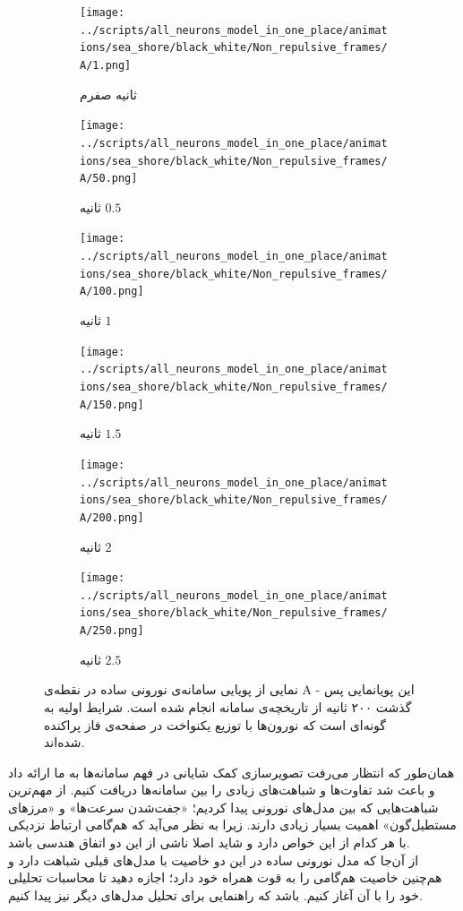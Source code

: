 \newpage
\begin{figure}
	\begin{subfigure}{0.5\textwidth}
		\texttt{[image: ../scripts/all\_neurons\_model\_in\_one\_place/animations/sea\_shore/black\_white/Non\_repulsive\_frames/A/1.png]}
		\caption{
			ثانیه صفرم		
		}
	\end{subfigure}
	\hfill
	\begin{subfigure}{0.5\textwidth}
		\texttt{[image: ../scripts/all\_neurons\_model\_in\_one\_place/animations/sea\_shore/black\_white/Non\_repulsive\_frames/A/50.png]}
		\caption{
			ثانیه $0.5$
		}
	\end{subfigure}
	\hfill
	\begin{subfigure}{0.5\textwidth}
		\texttt{[image: ../scripts/all\_neurons\_model\_in\_one\_place/animations/sea\_shore/black\_white/Non\_repulsive\_frames/A/100.png]}
		\caption{
			ثانیه $1$		
		}
	\end{subfigure}
	\hfill
	\begin{subfigure}{0.5\textwidth}
		\texttt{[image: ../scripts/all\_neurons\_model\_in\_one\_place/animations/sea\_shore/black\_white/Non\_repulsive\_frames/A/150.png]}
		\caption{
			ثانیه $1.5$
		}
	\end{subfigure}
	\hfill
	\begin{subfigure}{0.5\textwidth}
		\texttt{[image: ../scripts/all\_neurons\_model\_in\_one\_place/animations/sea\_shore/black\_white/Non\_repulsive\_frames/A/200.png]}
		\caption{
			ثانیه $2$
		}
	\end{subfigure}
	\hfill
	\begin{subfigure}{0.5\textwidth}
		\texttt{[image: ../scripts/all\_neurons\_model\_in\_one\_place/animations/sea\_shore/black\_white/Non\_repulsive\_frames/A/250.png]}
		\caption{
			ثانیه $2.5$
		}
	\end{subfigure}
	\hfill
	\caption{
		نمایی از پویایی سامانه‌ی نورونی ساده در نقطه‌ی A - این پویانمایی پس گذشت ۲۰۰ ثانیه از تاریخچه‌ی سامانه انجام شده است. شرایط اولیه به گونه‌ای است که نورون‌ها با توزیع یکنواخت در صفحه‌ی فاز پراکنده شده‌اند.	
	}
	\label{fig:simple_animation_A}
\end{figure}

همان‌طور که انتظار می‌رفت تصویرسازی کمک شایانی در فهم سامانه‌ها به ما ارائه داد و باعث شد تفاوت‌ها و شباهت‌های زیادی را بین سامانه‌ها دریافت کنیم. از مهم‌ترین شباهت‌هایی که بین مدل‌های نورونی پیدا کردیم؛ «جفت‌شدن سرعت‌ها» و «مرزهای مستطیل‌گون» اهمیت بسیار زیادی دارند. زیرا به نظر می‌آيد که هم‌گامی ارتباط نزدیکی با هر کدام از این خواص دارد و شاید اصلا ناشی از این دو اتفاق هندسی باشد.\\
از آن‌جا که مدل نورونی ساده در این دو خاصیت با مدل‌های قبلی شباهت دارد و هم‌چنین خاصیت هم‌گامی را به قوت همراه خود دارد؛ اجازه دهید تا محاسبات تحلیلی خود را با آن آغاز کنیم. باشد که راهنمایی برای تحلیل مدل‌های دیگر نیز پیدا کنیم.













